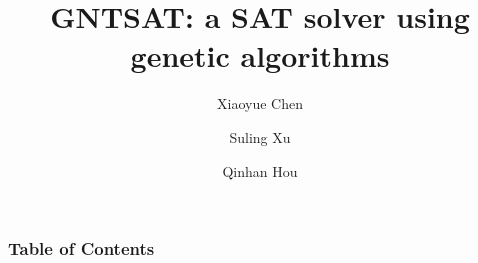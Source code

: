 \documentclass{beamer}
\title[GNTSAT]{GNTSAT: a SAT solver using genetic algorithms}
\author[Chen, Xu, Hou]{
	Xiaoyue Chen \and Suling Xu \and Qinhan Hou
}
\institute[UU]{Uppsala University}
\begin{document}
\frame{\titlepage}

\begin{frame}
	\frametitle{Table of Contents}
	\tableofcontents
\end{frame}




\end{document}
